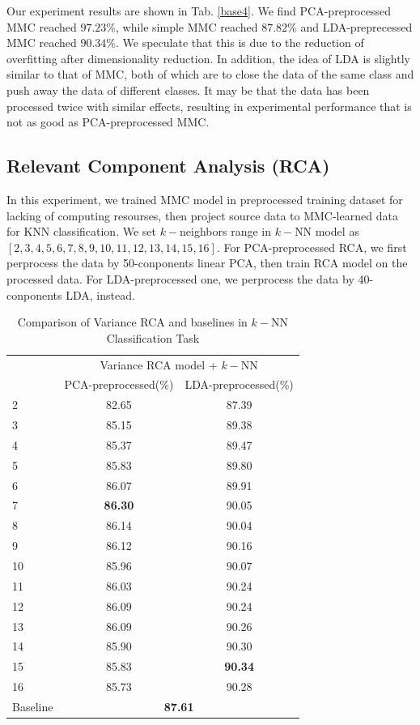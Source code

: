 \documentclass[conference]{IEEEtran}
\begin{document}
Our experiment results are shown in Tab. \ref{base4}. We find PCA-preprocessed MMC reached $97.23\%$, while simple MMC reached $87.82\%$ and LDA-preprecessed MMC reached $90.34\%$. We speculate that this is due to the reduction of overfitting after dimensionality reduction. In addition, the idea of LDA is slightly similar to that of MMC, both of which are to close the data of the same class and push away the data of different classes. It may be that the data has been processed twice with similar effects, resulting in experimental performance that is not as good as PCA-preprocessed MMC.
\subsection{Relevant Component Analysis (RCA)}
In this experiment, we trained MMC model in preprocessed training dataset for lacking of computing resourses, then project source data to MMC-learned data for KNN classification. We set $k-$neighbors range in $k-$NN model as $[2, 3, 4, 5, 6, 7, 8, 9, 10, 11, 12, 13, 14, 15, 16]$. For PCA-preprocessed RCA, we first perprocess the data by 50-conponents linear PCA, then train RCA model on the processed data. For LDA-preprocessed one, we perprocess the data by 40-conponents LDA, instead.
\begin{table}[htbp]
	\centering
 	\newcommand{\tabincell}[2]{\begin{tabular}{@{}#1@{}}#2\end{tabular}}
 	\renewcommand\arraystretch{1.0}
 	\caption{Comparison of Variance RCA and baselines in $k-$NN Classification Task}
 	\label{base5}%
 		\begin{tabular}{@{}p{1cm}<{\centering}|c|c}
 		\hline
 		\multirow{2}{*}{\diagbox[height=2\line,width=1.42cm,font=\tiny]{$k$}{Acc.}{$\mathit{M}$}} &
 		\multicolumn{2}{c}{Variance RCA model + $k-$NN}\\
 		\cline{2-3}
		    & {PCA-preprocessed(\%)} & {LDA-preprocessed(\%)}\\
 		\hline
 		2   &82.65  &87.39 \\
 		3   &85.15  &89.38 \\
 		4   &85.37  &89.47 \\
 		5   &85.83  &89.80 \\
 		6   &86.07  &89.91 \\
 		7   &\textbf{86.30} &90.05 \\
 		8   &86.14  &90.04 \\
 		9   &86.12  &90.16 \\
 		10   &85.96  &90.07 \\
 		11   &86.03  &90.24 \\
 		12   &86.09  &90.24 \\
 		13   &86.09  &90.26  \\
 		14   &85.90  &90.30 \\
 		15   &85.83  &\textbf{90.34} \\
		16   &85.73  &90.28 \\
		\hline
		Baseline & \multicolumn{2}{c}{\textbf{87.61}} \\
 		\hline
 	\end{tabular}
\end{table}
\end{document}

